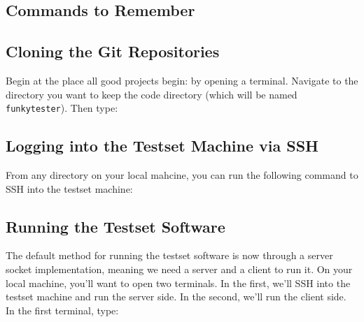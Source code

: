 \documentclass{report}
\begin{document}
\begin{appendices}
\chapter{Commands to Remember} \label{app:cmd}

\section{Cloning the Git Repositories} \label{sec:gitcloning}
Begin at the place all good projects begin: by opening a terminal. Navigate to the directory you want to keep the code directory (which will be named \texttt{funkytester}). Then type:\\



\section{Logging into the Testset Machine via SSH} \label{sec:SSH}
From any directory on your local mahcine, you can run the following command to SSH into the testset machine:\\



\section{Running the Testset Software} \label{sec:run}
The default method for running the testset software is now through a server socket implementation, meaning we need a server and a client to run it. On your local machine, you'll want to open two terminals. In the first, we'll SSH into the testset machine and run the server side. In the second, we'll run the client side. In the first terminal, type:\\


\end{appendices}
\end{document}
